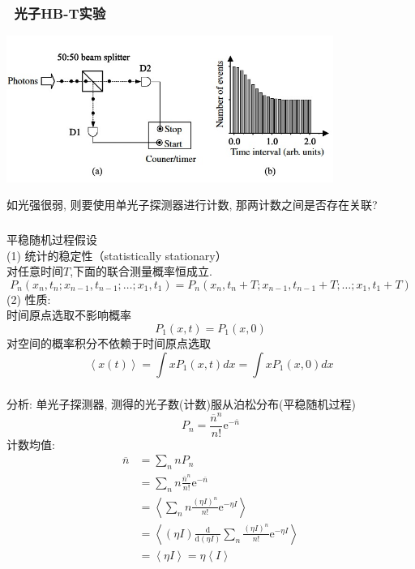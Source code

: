  \begin{frame} 
  \frametitle{ 光子HB-T实验}
         \begin{center}
              \includegraphics[width=0.8\textwidth]{figs/2022-05-08-16-13-39.png}
         \end{center}
     如光强很弱, 则要使用单光子探测器进行计数, 那两计数之间是否存在关联?
 \end{frame}

 \begin{frame} 
    \frametitle{}
    平稳随机过程假设\\
    (1) 统计的稳定性（statistically stationary）\\ 
    对任意时间$T$,下面的联合测量概率恒成立.
         \[ P_{n}\left(x_{n}, t_{n} ; x_{n-1}, t_{n-1} ; \ldots ; x_{1}, t_{1}\right)=P_{n}\left(x_{n}, t_{n}+T ; x_{n-1}, t_{n-1}+T ; \ldots ; x_{1}, t_{1}+T\right)\]
    (2) 性质: \\ 
    时间原点选取不影响概率
    \[ P_1(x,t)=P_1(x,0)\]
    对空间的概率积分不依赖于时间原点选取
    \[ \left\langle x(t) \right\rangle = \int x P_1(x,t)dx=  \int x P_1(x,0)dx  \]
    \end{frame}

 \begin{frame} 
  \frametitle{}
    分析: 单光子探测器, 测得的光子数(计数)服从泊松分布(平稳随机过程)
       \[  P_n = \frac{\overline{n}^n }{n!} \mathrm{e}^{- \overline{n} }\]
       计数均值:
    \[ \begin{aligned}
        \overline{n} &= \sum_n n P_n\\
        &=\sum_n n \frac{\overline{n}^n }{n!} \mathrm{e}^{- \overline{n} } \\
        &= \left\langle \sum_n n \frac{(\eta I)^n }{n!} \mathrm{e}^{- \eta I }  \right\rangle \\ 
        &= \left\langle (\eta I) \frac{\mathrm{d}}{\mathrm{d}(\eta I)}\sum_n  \frac{(\eta I)^n }{n!} \mathrm{e}^{-\eta I }  \right\rangle \\
        &=  \left\langle \eta I \right\rangle = \eta \left\langle I \right\rangle
    \end{aligned}\] 
 \end{frame}

